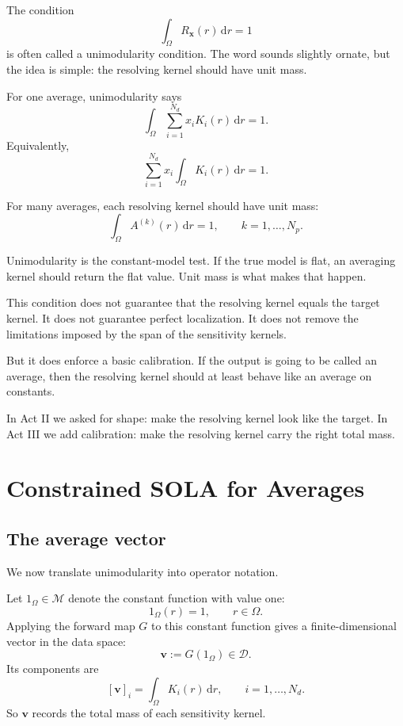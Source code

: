 \documentclass[11pt,openany]{book}
\theoremstyle{definition}
\theoremstyle{remark}
\newcommand{\M}{\mathcal M}
\newcommand{\D}{\mathcal D}
\newcommand{\dd}{\,\mathrm d}
\begin{document}
The condition
\[
  \int_\Omega R_{\mathbf x}(r)\dd r=1
\]
is often called a unimodularity condition. The word sounds slightly ornate, but the idea is
simple: the resolving kernel should have unit mass.

For one average, unimodularity says
\[
  \int_\Omega
  \sum_{i=1}^{N_d}x_iK_i(r)\dd r
  =
  1.
\]
Equivalently,
\[
  \sum_{i=1}^{N_d}
  x_i
  \int_\Omega K_i(r)\dd r
  =
  1.
\]

For many averages, each resolving kernel should have unit mass:
\[
  \int_\Omega A^{(k)}(r)\dd r=1,
  \qquad k=1,\dots,N_p.
\]

\begin{intuitionbox}
Unimodularity is the constant-model test. If the true model is flat, an averaging kernel should
return the flat value. Unit mass is what makes that happen.
\end{intuitionbox}

This condition does not guarantee that the resolving kernel equals the target kernel. It does not
guarantee perfect localization. It does not remove the limitations imposed by the span of the
sensitivity kernels.

But it does enforce a basic calibration. If the output is going to be called an average, then the
resolving kernel should at least behave like an average on constants.

\begin{checkpointbox}
In Act II we asked for shape: make the resolving kernel look like the target. In Act III we add
calibration: make the resolving kernel carry the right total mass.
\end{checkpointbox}

\chapter{Constrained SOLA for Averages}

\section{The average vector}

We now translate unimodularity into operator notation.

Let \(1_\Omega\in\M\) denote the constant function with value one:
\[
  1_\Omega(r)=1,
  \qquad r\in\Omega.
\]
Applying the forward map \(G\) to this constant function gives a finite-dimensional vector in the
data space:
\[
  \mathbf v:=G(1_\Omega)\in\D.
\]
Its components are
\[
  [\mathbf v]_i
  =
  \int_\Omega K_i(r)\dd r,
  \qquad i=1,\dots,N_d.
\]
So \(\mathbf v\) records the total mass of each sensitivity kernel.
\end{document}
